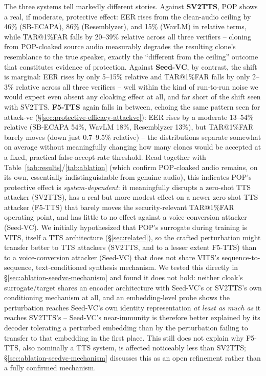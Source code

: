 \documentclass[11pt]{article}
\begin{document}
The three systems tell markedly different stories. Against
\textbf{SV2TTS}, POP shows a real, if moderate, protective effect: EER
rises from the clean-audio ceiling by 46\% (SB-ECAPA), 86\%
(Resemblyzer), and 15\% (WavLM) in relative terms, while TAR@1\%FAR
falls by 20--39\% relative across all three verifiers -- cloning from
POP-cloaked source audio measurably degrades the resulting clone's
resemblance to the true speaker, exactly the ``different from the
ceiling'' outcome that constitutes evidence of protection. Against
\textbf{Seed-VC}, by contrast, the shift is marginal: EER rises by
only 5--15\% relative and TAR@1\%FAR falls by only 2--3\% relative
across all three verifiers -- well within the kind of run-to-run noise
we would expect even absent any cloaking effect at all, and far short
of the shift seen with SV2TTS. \textbf{F5-TTS} again falls in between,
echoing the same pattern seen for attack-vc
(\S\ref{sec:protective-efficacy-attackvc}): EER rises by a moderate
13--54\% relative (SB-ECAPA 54\%, WavLM 18\%, Resemblyzer 13\%), but
TAR@1\%FAR barely moves (down just 0.7--9.5\% relative) -- the
distributions separate somewhat on average without meaningfully
changing how many clones would be accepted at a fixed, practical
false-accept-rate threshold. Read together with
Table~\ref{tab:results}/\ref{tab:ablation} (which confirm POP-cloaked
audio remains, on its own, essentially indistinguishable from genuine
audio), this indicates POP's protective effect is
\emph{system-dependent}: it meaningfully disrupts a zero-shot
TTS attacker (SV2TTS), has a real but more modest effect on a newer
zero-shot TTS attacker (F5-TTS) that barely moves the security-relevant
TAR@1\%FAR operating point, and has little to no effect against a
voice-conversion attacker (Seed-VC). We initially hypothesized that
POP's surrogate during training is VITS, itself a TTS architecture
(\S\ref{sec:related}), so the crafted perturbation might transfer
better to TTS attackers (SV2TTS, and to a lesser extent F5-TTS) than to
a voice-conversion attacker (Seed-VC) that does not share VITS's
sequence-to-sequence, text-conditioned synthesis mechanism. We tested
this directly in \S\ref{sec:ablation-seedvc-mechanism} and found it
does not hold: neither cloak's surrogate/target shares an encoder
architecture with Seed-VC's or SV2TTS's own conditioning mechanism at
all, and an embedding-level probe shows the perturbation reaches
Seed-VC's own identity representation \emph{at least as much as} it
reaches SV2TTS's -- Seed-VC's near-immunity is therefore better
explained by its decoder tolerating a perturbed embedding than by the
perturbation failing to transfer to that embedding in the first place.
This still does not explain why F5-TTS, also nominally a TTS system,
is affected noticeably less than SV2TTS; \S\ref{sec:ablation-seedvc-mechanism}
discusses this as an open refinement rather than a fully confirmed
mechanism.
\end{document}
